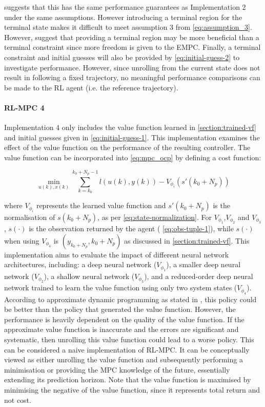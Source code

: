 \cite{amritEconomicOptimizationUsing2011} suggests that this has the same performance guarantees as Implementation 2 under the same assumptions. However introducing a terminal region for the terminal state makes it difficult to meet assumption 3 from \autoref{eq:assumption_3}. However, \cite{amritEconomicOptimizationUsing2011} suggest that providing a terminal region may be more beneficial than a terminal constraint since more freedom is given to the EMPC. Finally, a terminal constraint and initial guesses will also be provided by \autoref{eq:initial-guess-2} to investigate performance. However, since unrolling from the current state does not result in following a fixed trajectory, no meaningful performance comparisons can be made to the RL agent (i.e. the reference trajectory).

\paragraph{RL-MPC 4}
Implementation 4 only includes the value function learned in \autoref{section:trained-vf} and initial guesses given in \autoref{eq:initial-guess-1}. This implementation examines the effect of the value function on the performance of the resulting controller. The value function can be incorporated into \autoref{eq:mpc_ocp} by defining a cost function:

\begin{equation}\label{eq:cost-function}
		\min_{u(k),x(k)}  \sum_{k = k_0}^{k_0 + N_p - 1}{l(u(k), y(k))} - V_{\phi_i}(s'(k_0 + N_p))
\end{equation}

where $V_{\phi_i}$ represents the learned value function and $s'(k_0+N_p)$ is the normalisation of $s(k_0+N_p)$, as per \autoref{eq:state-normalization}. For $V_{\phi_1}$,$V_{\phi_2}$ and $V_{\phi_3}$, $s(\cdot)$ is the observation returned by the agent ( \autoref{eq:obs-tuple-1}), while $s(\cdot)$ when using $V_{\phi_4}$ is $(y_{k_0+N_p},k_0+N_p)$ as discussed in \autoref{section:trained-vf}. This implementation aims to evaluate the impact of different neural network architectures, including: a deep neural network ($V_{\phi_1}$), a smaller deep neural network ($V_{\phi_2}$), a shallow neural network ($V_{\phi_3}$), and a reduced-order deep neural network trained to learn the value function using only two system states ($V_{\phi_4}$). According to approximate dynamic programming as stated in \cite{bertsekasLessonsAlphaZeroOptimal}, this policy could be better than the policy that generated the value function. However, the performance is heavily dependent on the quality of the value function. If the approximate value function is inaccurate and the errors are significant and systematic, then unrolling this value function could lead to a worse policy. This can be considered a naive implementation of RL-MPC. It can be conceptually viewed as either unrolling the value function and subsequently performing a minimisation or providing the MPC knowledge of the future, essentially extending its prediction horizon. Note that the value function is maximised by minimising the negative of the value function, since it represents total return and not cost.

